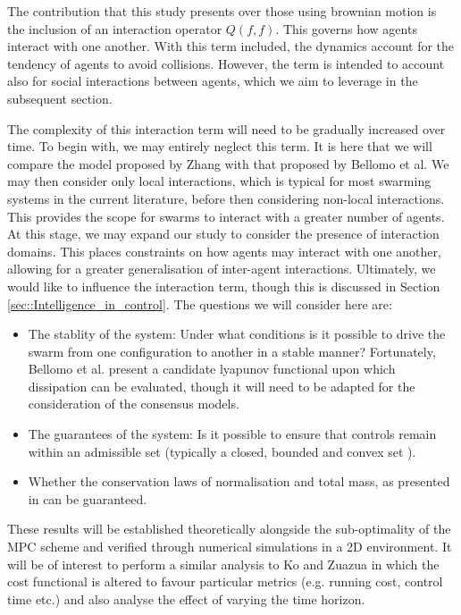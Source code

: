 \documentclass[.../main.tex]{subfiles}
\begin{document}
	The contribution that this study presents over those using brownian motion is the inclusion of an
	interaction operator $Q(f, f)$. This governs how agents interact with one another. With this
	term included, the dynamics account for the tendency of agents to avoid collisions. However,
	the term is intended to account also for social interactions between agents, which we aim to
	leverage in the subsequent section.

	The complexity of this interaction term will need to be gradually increased over time. To begin
	with, we may entirely neglect this term. It is here that we will compare the model proposed by Zhang
	with that proposed by Bellomo et al. We may then consider only local interactions, which is typical
	for most swarming systems in the current literature, before then considering non-local interactions.
	This provides the scope for swarms to interact with a greater number of agents. At this stage, we
	may expand our study to consider the presence of interaction domains. This places constraints on how
	agents may interact with one another, allowing for a greater generalisation of inter-agent
	interactions. Ultimately, we would like to influence the interaction term, though this is discussed
	in Section \ref{sec::Intelligence_in_control}. The questions we will
	consider here are:

	\begin{itemize}
		\item The stablity of the system: Under what conditions is it possible to drive the
		swarm from one configuration to another in a stable manner? Fortunately, Bellomo et al.
		present a candidate lyapunov functional upon which dissipation can be evaluated, though it
		will need to be adapted for the consideration of the consensus models.
		\item The guarantees of the system: Is it possible to ensure that controls remain within an
		admissible set (typically a closed, bounded and convex set \cite{Fredi2010}).
		\item Whether the conservation laws of normalisation and total mass, as presented in 
		\cite{Bellomo2017} can be guaranteed.
	\end{itemize}

	These results will be established theoretically alongside the sub-optimality of the MPC scheme
	and verified through numerical simulations in a 2D environment. It
    will be of interest to perform a similar analysis to Ko and Zuazua \cite{Ko2019} in which the
    cost functional is altered to favour particular metrics  (e.g. running cost, control time etc.)
    and also analyse the effect of varying the time horizon.
\end{document}
